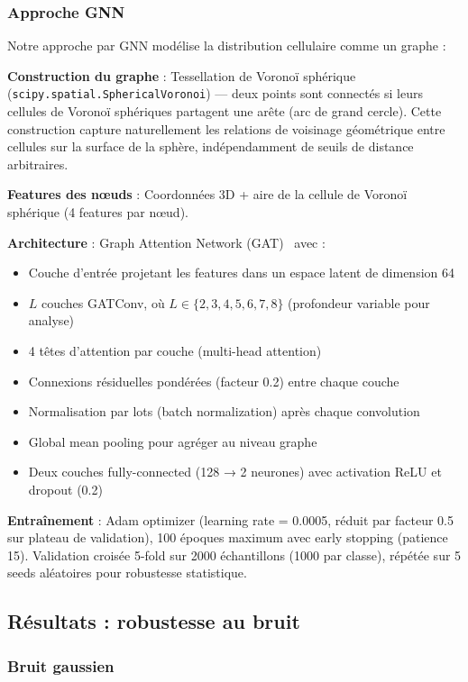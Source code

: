 \subsubsection{Approche GNN}

Notre approche par GNN modélise la distribution cellulaire comme un graphe :

\textbf{Construction du graphe} : Tessellation de Voronoï sphérique (\texttt{scipy.spatial.SphericalVoronoi}) — deux points sont connectés si leurs cellules de Voronoï sphériques partagent une arête (arc de grand cercle). Cette construction capture naturellement les relations de voisinage géométrique entre cellules sur la surface de la sphère, indépendamment de seuils de distance arbitraires.

\textbf{Features des nœuds} : Coordonnées 3D + aire de la cellule de Voronoï sphérique (4 features par nœud).

\textbf{Architecture} : Graph Attention Network (GAT)~\cite{gatvcnn2018} avec :
\begin{itemize}
    \item Couche d'entrée projetant les features dans un espace latent de dimension 64
    \item $L$ couches GATConv, où $L \in \{2, 3, 4, 5, 6, 7, 8\}$ (profondeur variable pour analyse)
    \item 4 têtes d'attention par couche (multi-head attention)
    \item Connexions résiduelles pondérées (facteur 0.2) entre chaque couche
    \item Normalisation par lots (batch normalization) après chaque convolution
    \item Global mean pooling pour agréger au niveau graphe
    \item Deux couches fully-connected (128 → 2 neurones) avec activation ReLU et dropout (0.2)
\end{itemize}

\textbf{Entraînement} : Adam optimizer (learning rate = 0.0005, réduit par facteur 0.5 sur plateau de validation), 100 époques maximum avec early stopping (patience 15). Validation croisée 5-fold sur 2000 échantillons (1000 par classe), répétée sur 5 seeds aléatoires pour robustesse statistique.

\subsection{Résultats : robustesse au bruit}

\subsubsection{Bruit gaussien}

